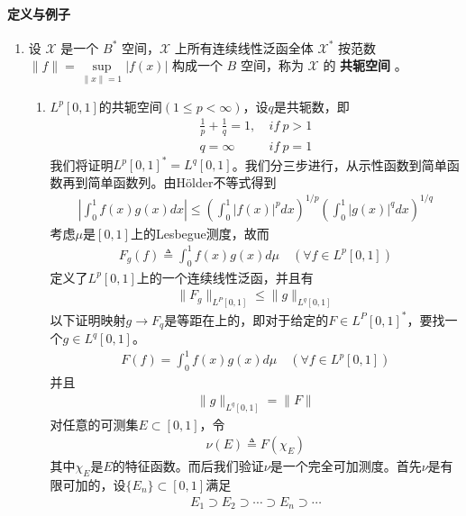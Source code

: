 	\paragraph{定义与例子}
	\begin{enumerate}[leftmargin=2cm, label=\arabic*]
		\item 设 $\mathscr{X}$ 是一个 $B^*$ 空间，$\mathscr{X}$ 上所有连续线性泛函全体 $\mathscr{X}^*$ 按范数 $\|f\| = \sup\limits_{\|x\| = 1} |f(x)|$ 构成一个 $B$ 空间，称为 $\mathscr{X}$ 的 \textbf{共轭空间} 。
		\begin{enumerate}[leftmargin=1cm, label=(\arabic*)]
			\item $L^p[0,1]$的共轭空间$(1\leqslant p<\infty)$，设$q$是共轭数，即
			\begin{align*}
				\frac{1}{p} + \frac{1}{q} = 1, &\ if\ p>1 \\
				q = \infty &\ if\ p = 1
			\end{align*}
			我们将证明$L^p[0,1]^* = L^q[0,1]$。我们分三步进行，从示性函数到简单函数再到简单函数列。由Hölder不等式得到
			\begin{align*}
				\left|\int_0^1 f(x)g(x) dx \right| \leqslant \left(\int_0^1 |f(x)|^p dx\right)^{1/p} \left(\int_0^1 |g(x)|^q dx \right)^{1/q}
			\end{align*}
			考虑$\mu$是$[0,1]$上的Lesbegue测度，故而
			\begin{align*}
				F_g(f) \triangleq \int_0^1 f(x)g(x)d\mu \quad (\forall f\in L^p[0,1])
			\end{align*}
			定义了$L^p[0,1]$上的一个连续线性泛函，并且有
			\begin{align*}
				\|F_g\|_{L^P[0,1]} \leqslant \|g\|_{L^q[0,1]}
			\end{align*}
			以下证明映射$g\to F_q$是等距在上的，即对于给定的$F\in L^P[0,1]^*$，要找一个$g\in L^q[0,1]$。
			\begin{align*}
				F(f) =\int_0^1 f(x)g(x) d\mu \quad (\forall f\in L^p[0,1])
			\end{align*}
			并且
			\begin{align*}
				\|g\|_{L^q[0,1]} = \|F\|
			\end{align*}
			对任意的可测集$E\subset [0,1]$，令
			\begin{align*}
				\nu(E) \triangleq F(\chi_E)
			\end{align*}
			其中$\chi_E$是$E$的特征函数。而后我们验证$\nu$是一个完全可加测度。首先$\nu$是有限可加的，设$\{E_n\}\subset[0,1]$满足
			\begin{align*}
				E_1\supset E_2\supset \cdots \supset E_n \supset \cdots

\end{align*}
\end{enumerate}
\end{enumerate}
